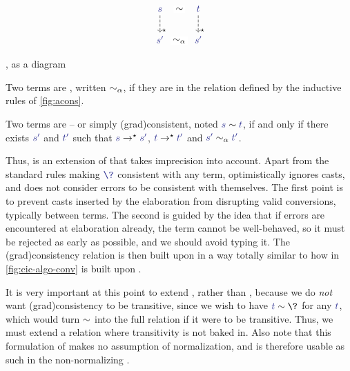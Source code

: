 \begin{marginfigure}[4em]
  \[\begin{tikzcd}
    \tcol{s} \arrow[d, dashed, "\star" very near end] \arrow[r, phantom, "\cons" description] &
    \tcol{t} \arrow[d, dashed, "\star" very near end] \\
    \tcol{s'} \arrow[r,phantom,"\acons" description] & \tcol{s'}
  \end{tikzcd}\]
  \caption{, as a diagram}
\end{marginfigure}

\begin{definition}
	\label{def:cons}
	Two  terms are , written $\sim_{\alpha}$,
  if they are in the relation defined by the inductive rules of \cref{fig:acons}.

	Two terms are  – or simply \reintro(grad){consistent},
  noted $\tcol{s} \cons \tcol{t}$, if and only if there exists $\tcol{s'}$ and $\tcol{t'}$ such that $\tcol{s} \red \tcol{s'}$, $\tcol{t} \red \tcol{t'}$ and $\tcol{s'} \acons \tcol{t'}$.
\end{definition}

Thus,  is an extension of  that takes imprecision into account.
Apart from the standard rules making $\tcol{\?}$ consistent with any term,
 optimistically ignores casts,
and does not consider errors to be consistent with themselves.
The first point is to prevent casts inserted by the elaboration from disrupting valid
conversions, typically between  terms.
The second is guided by the idea that if errors are encountered at elaboration already,
the term cannot be well-behaved,
so it must be rejected as early as possible, and we should avoid typing it.
The \kl(grad){consistency} relation is then built upon  in a way totally similar to
how  in \cref{fig:cic-algo-conv} is built upon .

It is very important at this point to extend , rather than
, because we do \emph{not} want \kl(grad){consistency}
to be transitive,
since we wish to have $\tcol{t} \cons \?$ for any $\tcol{t}$, which would turn $\sim$ into
the full relation if it were to be transitive. Thus, we must extend a relation where
transitivity is not baked in.
Also note that this formulation of  makes no assumption of
normalization, and is therefore usable as such in the non-normalizing .

